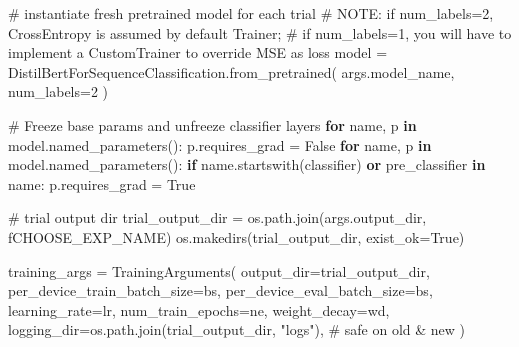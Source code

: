 \documentclass[
  letterpaper,
  DIV=11,
  numbers=noendperiod]{scrartcl}
\newenvironment{Shaded}{\begin{snugshade}}{\end{snugshade}}
\newcommand{\AlertTok}[1]{\textcolor[rgb]{0.68,0.00,0.00}{#1}}
\newcommand{\CommentTok}[1]{\textcolor[rgb]{0.37,0.37,0.37}{#1}}
\newcommand{\ControlFlowTok}[1]{\textcolor[rgb]{0.00,0.23,0.31}{\textbf{#1}}}
\newcommand{\DecValTok}[1]{\textcolor[rgb]{0.68,0.00,0.00}{#1}}
\newcommand{\KeywordTok}[1]{\textcolor[rgb]{0.00,0.23,0.31}{\textbf{#1}}}
\newcommand{\NormalTok}[1]{\textcolor[rgb]{0.00,0.23,0.31}{#1}}
\newcommand{\OperatorTok}[1]{\textcolor[rgb]{0.37,0.37,0.37}{#1}}
\newcommand{\SpecialStringTok}[1]{\textcolor[rgb]{0.13,0.47,0.30}{#1}}
\newcommand{\StringTok}[1]{\textcolor[rgb]{0.13,0.47,0.30}{#1}}
\newcommand{\VariableTok}[1]{\textcolor[rgb]{0.07,0.07,0.07}{#1}}
\begin{document}
\begin{Shaded}
\begin{Highlighting}[]
        \CommentTok{\# instantiate fresh pretrained model for each trial}
        \CommentTok{\# }\AlertTok{NOTE}\CommentTok{: if num\_labels=2, CrossEntropy is assumed by default Trainer;}
        \CommentTok{\# if num\_labels=1, you will have to implement a CustomTrainer to override MSE as loss}
\NormalTok{        model }\OperatorTok{=}\NormalTok{ DistilBertForSequenceClassification.from\_pretrained(}
\NormalTok{        args.model\_name, num\_labels}\OperatorTok{=}\DecValTok{2}
\NormalTok{    )}

        \CommentTok{\# Freeze base params and unfreeze classifier layers}
        \ControlFlowTok{for}\NormalTok{ name, p }\KeywordTok{in}\NormalTok{ model.named\_parameters():}
\NormalTok{            p.requires\_grad }\OperatorTok{=} \VariableTok{False}
        \ControlFlowTok{for}\NormalTok{ name, p }\KeywordTok{in}\NormalTok{ model.named\_parameters():}
            \ControlFlowTok{if}\NormalTok{ name.startswith(}\StringTok{\textquotesingle{}classifier\textquotesingle{}}\NormalTok{) }\KeywordTok{or} \StringTok{\textquotesingle{}pre\_classifier\textquotesingle{}} \KeywordTok{in}\NormalTok{ name:}
\NormalTok{                p.requires\_grad }\OperatorTok{=} \VariableTok{True}

        \CommentTok{\# trial output dir}
\NormalTok{        trial\_output\_dir }\OperatorTok{=}\NormalTok{ os.path.join(args.output\_dir, }\SpecialStringTok{f\textquotesingle{}CHOOSE\_EXP\_NAME\textquotesingle{}}\NormalTok{)}
\NormalTok{        os.makedirs(trial\_output\_dir, exist\_ok}\OperatorTok{=}\VariableTok{True}\NormalTok{)}

\NormalTok{        training\_args }\OperatorTok{=}\NormalTok{ TrainingArguments(}
\NormalTok{            output\_dir}\OperatorTok{=}\NormalTok{trial\_output\_dir,}
\NormalTok{            per\_device\_train\_batch\_size}\OperatorTok{=}\NormalTok{bs,}
\NormalTok{            per\_device\_eval\_batch\_size}\OperatorTok{=}\NormalTok{bs,}
\NormalTok{            learning\_rate}\OperatorTok{=}\NormalTok{lr,}
\NormalTok{            num\_train\_epochs}\OperatorTok{=}\NormalTok{ne,}
\NormalTok{            weight\_decay}\OperatorTok{=}\NormalTok{wd,}
\NormalTok{            logging\_dir}\OperatorTok{=}\NormalTok{os.path.join(trial\_output\_dir, }\StringTok{"logs"}\NormalTok{),  }\CommentTok{\# safe on old \& new}
\NormalTok{        )}


\end{Highlighting}
\end{Shaded}
\end{document}
